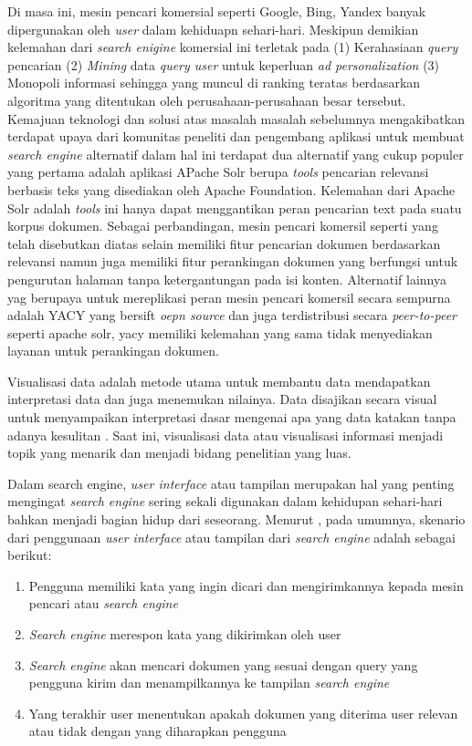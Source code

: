 \documentclass[
	a4paper, %
	10pt, %
	unnumberedsections, %
	twoside, %
]{LTJournalArticle}
\begin{document}
Di masa ini, mesin pencari komersial seperti Google, Bing, Yandex banyak dipergunakan oleh \textit{user} dalam kehiduapn sehari-hari. Meskipun demikian kelemahan dari \textit{search enigine} komersial ini terletak pada (1) Kerahasiaan \textit{query} pencarian (2) \textit{Mining} data \textit{query user} untuk keperluan \textit{ad personalization} (3) Monopoli informasi sehingga yang muncul di ranking teratas berdasarkan algoritma yang ditentukan oleh perusahaan-perusahaan besar tersebut. Kemajuan teknologi dan solusi atas masalah masalah sebelumnya mengakibatkan terdapat upaya dari komunitas peneliti dan pengembang aplikasi untuk membuat \textit{search engine} alternatif dalam hal ini terdapat dua alternatif yang cukup populer yang pertama adalah aplikasi APache Solr berupa \textit{tools} pencarian relevansi berbasis teks yang disediakan oleh Apache Foundation. Kelemahan dari Apache Solr adalah \textit{tools} ini hanya dapat menggantikan peran pencarian text pada suatu korpus dokumen. Sebagai perbandingan, mesin pencari komersil seperti yang telah disebutkan diatas selain memiliki fitur pencarian dokumen berdasarkan relevansi namun juga memiliki fitur perankingan dokumen yang berfungsi untuk pengurutan halaman tanpa ketergantungan pada isi konten. Alternatif lainnya yag berupaya untuk mereplikasi peran mesin pencari komersil secara sempurna adalah YACY yang bersift \textit{oepn source} dan juga terdistribusi secara \textit{peer-to-peer} seperti apache solr, yacy memiliki kelemahan yang sama tidak menyediakan layanan untuk perankingan dokumen. 

Visualisasi data adalah metode utama untuk membantu data mendapatkan interpretasi data dan juga menemukan nilainya. Data disajikan secara visual untuk menyampaikan interpretasi dasar mengenai apa yang data katakan tanpa adanya kesulitan \citep{datavisualizationbalogun}. Saat ini, visualisasi data atau visualisasi informasi menjadi topik yang menarik dan menjadi bidang penelitian yang luas. \citep{dbpediacasestudy} 


Dalam search engine, \textit{user interface} atau tampilan merupakan hal yang penting mengingat \textit{search engine} sering sekali digunakan dalam kehidupan sehari-hari bahkan menjadi bagian hidup dari seseorang. Menurut \citep{alonsoumarbaezaricardo}, pada umumnya, skenario dari penggunaan \textit{user interface} atau tampilan dari \textit{search engine} adalah sebagai berikut: 

\begin{enumerate}
	\item Pengguna memiliki kata yang ingin dicari dan mengirimkannya kepada mesin pencari atau \textit{search engine}
	\item  \textit{Search engine} merespon kata yang dikirimkan oleh user
	\item \textit{Search engine} akan mencari dokumen yang sesuai dengan query yang pengguna kirim dan menampilkannya ke tampilan \textit{search engine}
	\item Yang terakhir user menentukan apakah dokumen yang diterima user relevan atau tidak dengan yang diharapkan pengguna
\end{enumerate}
\end{document}
